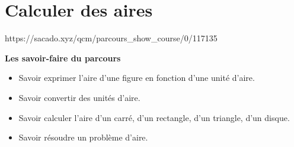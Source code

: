 
\chapter{Calculer des aires}
{https://sacado.xyz/qcm/parcours_show_course/0/117135}
{



\begin{CpsCol}
\textbf{ Les savoir-faire du parcours}
\begin{itemize}
\item Savoir exprimer l'aire d'une figure en fonction d'une unité d'aire.
\item Savoir convertir des unités d'aire.
\item Savoir calculer l'aire d'un carré, d'un rectangle, d'un triangle, d'un disque.
\item Savoir résoudre un problème d'aire.
\end{itemize}
\end{CpsCol}
 

}

